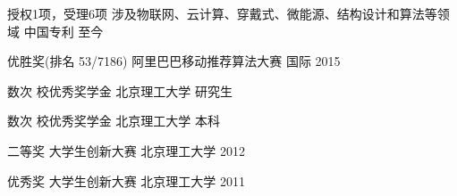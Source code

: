 




\begin{cvhonors}

\cvhonor
{授权1项，受理6项} %
{涉及物联网、云计算、穿戴式、微能源、结构设计和算法等领域} %
{中国专利} %
{至今} %

\cvhonor
{优胜奖(排名 53/7186)} %
{阿里巴巴移动推荐算法大赛} %
{ 国际} %
{2015} %

\cvhonor
{数次} %
{校优秀奖学金} %
{北京理工大学} %
{研究生} %


\cvhonor
{数次} %
{校优秀奖学金} %
{北京理工大学} %
{本科} %


\cvhonor
{二等奖} %
{大学生创新大赛} %
{北京理工大学} %
{2012} %

\cvhonor
{优秀奖} %
{大学生创新大赛} %
{北京理工大学} %
{2011} %


\end{cvhonors}

